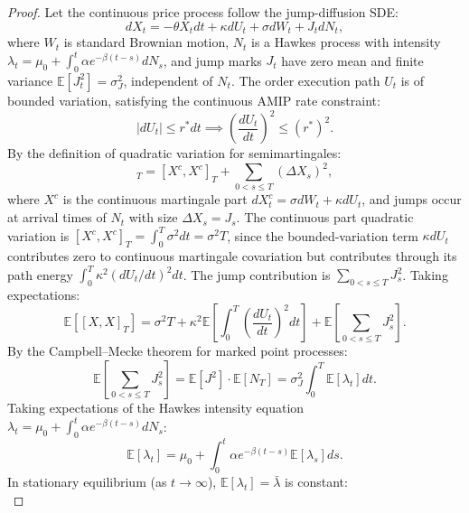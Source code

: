 \documentclass[11pt,a4paper]{article}
\theoremstyle{definition}\newtheorem{definition}[theorem]{Definition}
\theoremstyle{remark}\newtheorem{remark}[theorem]{Remark}
\begin{document}
\begin{proof}
Let the continuous price process follow the jump-diffusion SDE:
\begin{equation}
dX_t = -\theta X_t dt + \kappa dU_t + \sigma dW_t + J_t dN_t,
\end{equation}
where $W_t$ is standard Brownian motion, $N_t$ is a Hawkes process with intensity $\lambda_t = \mu_0 + \int_0^t \alpha e^{-\beta (t - s)} dN_s$, and jump marks $J_t$ have zero mean and finite variance $\mathbb{E}[J_t^2] = \sigma_J^2$, independent of $N_t$.
The order execution path $U_t$ is of bounded variation, satisfying the continuous AMIP rate constraint:
\begin{equation}
|dU_t| \le r^* dt \implies \left(\frac{dU_t}{dt}\right)^2 \le (r^*)^2.
\end{equation}
By the definition of quadratic variation for semimartingales:
\begin{equation}
[X, X]_T = [X^c, X^c]_T + \sum_{0 < s \le T} (\Delta X_s)^2,
\end{equation}
where $X^c$ is the continuous martingale part $dX_t^c = \sigma dW_t + \kappa dU_t$, and jumps occur at arrival times of $N_t$ with size $\Delta X_s = J_s$.
The continuous part quadratic variation is $[X^c, X^c]_T = \int_0^T \sigma^2 dt = \sigma^2 T$, since the bounded-variation term $\kappa dU_t$ contributes zero to continuous martingale covariation but contributes through its path energy $\int_0^T \kappa^2 (dU_t/dt)^2 dt$.
The jump contribution is $\sum_{0 < s \le T} J_s^2$. Taking expectations:
\begin{equation}
\mathbb{E}[[X, X]_T] = \sigma^2 T + \kappa^2 \mathbb{E}\left[ \int_0^T \left(\frac{dU_t}{dt}\right)^2 dt \right] + \mathbb{E}\left[ \sum_{0 < s \le T} J_s^2 \right].
\end{equation}
By the Campbell--Mecke theorem for marked point processes:
\begin{equation}
\mathbb{E}\left[ \sum_{0 < s \le T} J_s^2 \right] = \mathbb{E}[J^2] \cdot \mathbb{E}[N_T] = \sigma_J^2 \int_0^T \mathbb{E}[\lambda_t] dt.
\end{equation}
Taking expectations of the Hawkes intensity equation $\lambda_t = \mu_0 + \int_0^t \alpha e^{-\beta(t-s)} dN_s$:
\begin{equation}
\mathbb{E}[\lambda_t] = \mu_0 + \int_0^t \alpha e^{-\beta(t-s)} \mathbb{E}[\lambda_s] ds.
\end{equation}
In stationary equilibrium (as $t \to \infty$), $\mathbb{E}[\lambda_t] = \bar{\lambda}$ is constant:
\begin{equation}

\end{equation}
\end{proof}
\end{document}
